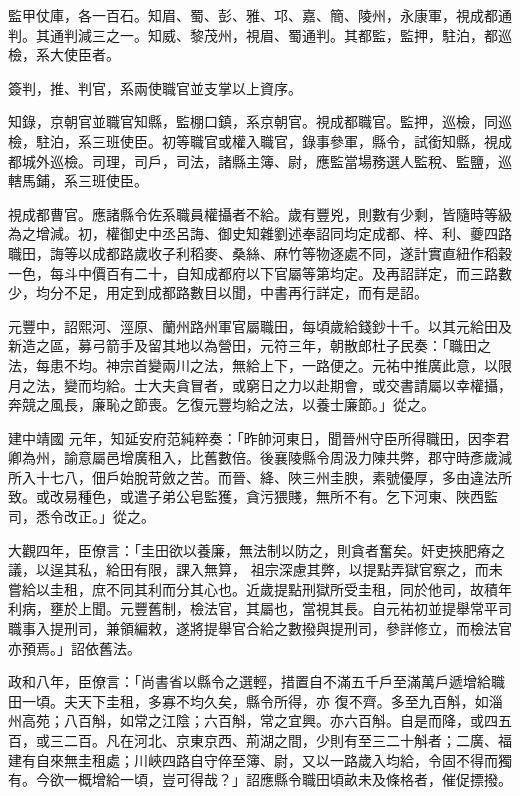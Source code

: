 \begin{pinyinscope}
 監甲仗庫，各一百石。知眉、蜀、彭、雅、邛、嘉、簡、陵州，永康軍，視成都通判。其通判減三之一。知威、黎茂州，視眉、蜀通判。其都監，監押，駐泊，都巡
 檢，系大使臣者。



 簽判，推、判官，系兩使職官並支掌以上資序。



 知錄，京朝官並職官知縣，監棚口鎮，系京朝官。視成都職官。監押，巡檢，同巡檢，駐泊，系三班使臣。初等職官或權入職官，錄事參軍，縣令，試銜知縣，視成都城外巡檢。司理，司戶，司法，諸縣主簿、尉，應監當場務選人監稅、監鹽，巡轄馬鋪，系三班使臣。



 視成都曹官。應諸縣令佐系職員權攝者不給。歲有豐兇，則數有少剩，皆隨時等級為之增減。初，權御史中丞呂誨、御史知雜劉述奉詔同均定成都、梓、利、夔四路職田，誨等以成都路歲收子利稻麥、桑絲、麻竹等物逐處不同，遂計實直紐作稻穀
 一色，每斗中價百有二十，自知成都府以下官屬等第均定。及再詔詳定，而三路數少，均分不足，用定到成都路數目以聞，中書再行詳定，而有是詔。



 元豐中，詔熙河、涇原、蘭州路州軍官屬職田，每頃歲給錢鈔十千。以其元給田及新造之區，募弓箭手及留其地以為營田，元符三年，朝散郎杜子民奏：「職田之法，每患不均。神宗首變兩川之法，無給上下，一路便之。元祐中推廣此意，以限月之法，變而均給。士大夫貪冒者，或窮日之力以赴期會，或交書請屬以幸權攝，奔競之風長，廉恥之節喪。乞復元豐均給之法，以養士廉節。」從之。



 建中靖國
 元年，知延安府范純粹奏：「昨帥河東日，聞晉州守臣所得職田，因李君卿為州，諭意屬邑增廣租入，比舊數倍。後襄陵縣令周汲力陳共弊，郡守時彥歲減所入十七八，佃戶始脫苛斂之苦。而晉、絳、陜三州圭腴，素號優厚，多由違法所致。或改易種色，或遣子弟公皂監獲，貪污猥賤，無所不有。乞下河東、陜西監司，悉令改正。」從之。



 大觀四年，臣僚言：「圭田欲以養廉，無法制以防之，則貪者奮矣。奸吏挾肥瘠之議，以逞其私，給田有限，課入無算，
 祖宗深慮其弊，以提點弄獄官察之，而未嘗給以圭租，庶不同其利而分其心也。近歲提點刑獄所受圭租，同於他司，故積年利病，壅於上聞。元豐舊制，檢法官，其屬也，當視其長。自元祐初並提舉常平司職事入提刑司，兼領編敕，遂將提舉官合給之數撥與提刑司，參詳修立，而檢法官亦預焉。」詔依舊法。



 政和八年，臣僚言：「尚書省以縣令之選輕，措置自不滿五千戶至滿萬戶遞增給職田一頃。夫天下圭租，多寡不均久矣，縣令所得，亦
 復不齊。多至九百斛，如淄州高苑；八百斛，如常之江陰；六百斛，常之宜興。亦六百斛。自是而降，或四五百，或三二百。凡在河北、京東京西、荊湖之間，少則有至三二十斛者；二廣、福建有自來無圭租處；川峽四路自守倅至簿、尉，又以一路歲入均給，令固不得而獨有。今欲一概增給一頃，豈可得哉？」詔應縣令職田頃畝未及條格者，催促摽撥。




\end{pinyinscope}
